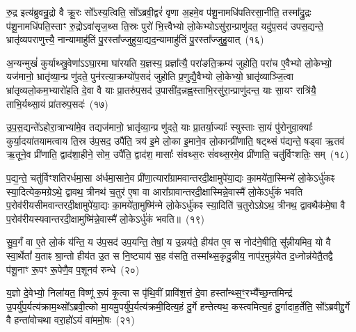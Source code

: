 रु॒द्र इत्य॑ब्रुवन्रु॒द्रो वै क्रू॒रः सो᳚\-ऽस्य॒त्विति॒ सो᳚\-ऽब्रवी॒द्वरं॑ वृणा अ॒हमे॒व प॑शू॒नामधि॑\-पतिरसा॒नीति॒ तस्मा᳚द्\-रु॒द्रः प॑शू॒नामधि॑\-पति॒स्ताꣳ रु॒द्रो\-ऽवा॑सृज॒थ्स ति॒स्रः पुरो॑ भि॒त्त्वैभ्यो लो॒केभ्यो\-ऽसु॑रा॒न्प्राणु॑दत॒ यदु॑प॒सद॑ उपस॒द्यन्ते॒ भ्रातृ॑व्यपराणुत्त्यै॒ नान्यामाहु॑तिं पु॒रस्ता᳚ज्जुहुया॒द्यद॒न्यामाहु॑तिं पु॒रस्ता᳚ज्जुहु॒यात्~(१६)\ip

अ॒न्यन्मुखं॑ कुर्याथ्स्रु॒वेणा॑\-ऽऽघा॒रमा घा॑रयति य॒ज्ञस्य॒ प्रज्ञा᳚त्यै॒ परा॑ङति॒क्रम्य॑ जुहोति॒ परा॑च ए॒वैभ्यो लो॒केभ्यो॒ यज॑मानो॒ भ्रातृ॑व्या॒न्प्र णु॑दते॒ पुन॑रत्या॒क्रम्यो॑प॒सदं॑ जुहोति प्र॒णुद्यै॒वैभ्यो लो॒केभ्यो॒ भ्रातृ॑व्याञ्जि॒त्वा भ्रा॑तृव्यलो॒कम॒भ्यारो॑हति दे॒वा वै याः प्रा॒तरु॑प॒सद॑ उ॒पासी॑द॒न्नह्न॒स्ताभि॒रसु॑रा॒न्प्राणु॑दन्त॒ याः सा॒यꣳ रात्रि॑यै॒ ताभि॒र्यथ्सा॒यं प्रा॑तरुप॒सदः॑~(१७)\ip

उ॒प॒स॒द्यन्ते॑\-ऽहोरा॒त्राभ्या॑मे॒व तद्यज॑मानो॒ भ्रातृ॑व्या॒न्प्र णु॑दते॒ याः प्रा॒तर्या॒ज्याः᳚ स्युस्ताः सा॒यं पु॑रोनुवा॒क्याः᳚ कुर्या॒दया॑तयामत्वाय ति॒स्र उ॑प॒सद॒ उपै॑ति॒ त्रय॑ इ॒मे लो॒का इ॒माने॒व लो॒कान्प्री॑णाति॒ षट्थ्सं प॑द्यन्ते॒ षड्वा ऋ॒तव॑ ऋ॒तूने॒व प्री॑णाति॒ द्वाद॑शा॒हीने॒ सोम॒ उपै॑ति॒ द्वाद॑श॒ मासाः᳚ संवथ्स॒रः सं॑वथ्स॒रमे॒व प्री॑णाति॒ चतु॑र्विꣳशतिः॒ सम्~(१८)\ip

प॒द्य॒न्ते॒ चतु॑र्विꣳशतिरर्धमा॒सा अ॑र्धमा॒साने॒व प्री॑णा॒त्यारा᳚ग्रामवान्तरदी॒क्षामुपे॑या॒द्यः का॒मये॑ता॒स्मिन्मे॑ लो॒के\-ऽर्धु॑कꣴ स्या॒दित्येक॒मग्रे\-ऽथे॒ द्वावथ॒ त्रीनथ॑ च॒तुर॑ ए॒षा वा आरा᳚ग्रावान्तरदी॒क्षास्मिन्ने॒वास्मै॑ लो॒के\-ऽर्धु॑कं भवति प॒रोव॑रीयसीमवान्तरदी॒क्षामुपे॑या॒द्यः का॒मये॑ता॒मुष्मि॑न्मे लो॒के\-ऽर्धु॑कꣴ स्या॒दिति॑ च॒तुरो\-ऽग्रे\-ऽथ॒ त्रीनथ॒ द्वावथैक॑मे॒षा वै प॒रोव॑रीयस्यवान्तरदी॒क्षामुष्मि॑न्ने॒वास्मै॑ लो॒के\-ऽर्धु॑कं भवति॥~(१९)\ip

{\anuvakamend[{अ॒सि॒ष्य॒तीति॑ जुहु॒याथ्सा॒यं प्रा॑तरुप॒सद॒श्चतु॑र्विꣳशतिः॒ सञ्च॒तुरो\-ऽग्रे॒ षोड॑श च}]}

सु॒व॒र्गं वा ए॒ते लो॒कं य॑न्ति॒ य उ॑प॒सद॑ उप॒यन्ति॒ तेषां॒ य उ॒न्नय॑ते॒ हीय॑त ए॒व स नोद॑ने॒षीति॒ सू᳚न्नीयमिव॒ यो वै स्वा॒र्थेतां᳚ य॒ताꣴ श्रा॒न्तो हीय॑त उ॒त स नि॒ष्ट्याय॑ स॒ह व॑सति॒ तस्मा᳚थ्स॒कृदु॒न्नीय॒ नाप॑र॒मुन्न॑येत द॒ध्नोन्न॑येतै॒तद्वै प॑शू॒नाꣳ रू॒पꣳ रू॒पेणै॒व प॒शूनव॑ रुन्धे~(२०)\ip

य॒ज्ञो दे॒वेभ्यो॒ निला॑यत॒ विष्णू॑ रू॒पं कृ॒त्वा स पृ॑थि॒वीं प्रावि॑श॒त्तं दे॒वा हस्ता᳚न्थ्स॒ꣳ॒रभ्यै᳚च्छ॒न्तमिन्द्र॑ उ॒पर्यु॑प॒र्यत्य॑क्राम॒थ्सो᳚\-ऽब्रवी॒त्को मा॒यमु॒पर्यु॑प॒र्यत्य॑क्रमी॒दित्य॒हं दु॒र्गे हन्तेत्यथ॒ कस्त्वमित्य॒हं दु॒र्गादाह॒र्तेति॒ सो᳚\-ऽब्रवीद्दु॒र्गे वै हन्ता॑वोचथा वरा॒हो॑\-ऽयं वा॑ममो॒षः~(२१)\ip

